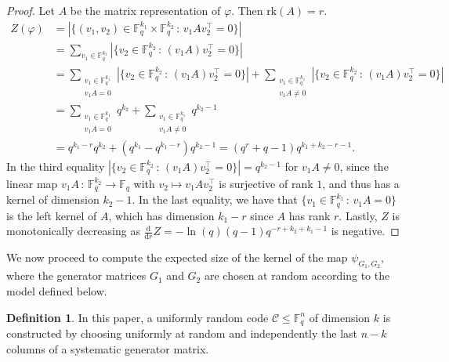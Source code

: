 \documentclass[a4paper,11pt,reqno]{article}
\newcommand{\F}{\mathbb{F}}
\newcommand{\rk}{\mathrm{rk}}
\newcommand{\C}{\mathcal{C}}
\theoremstyle{plain} \numberwithin{equation}{section}
\theoremstyle{definition}
\newtheorem{definition}[theorem]{Definition}
\begin{document}
\begin{proof}
Let $A$ be the matrix representation of $\varphi$. Then $\rk(A) = r$. 
    \begin{align*}
        Z(\varphi) &= |\{(v_1, v_2)\in \F_q^{k_1}\times \F_q^{k_2} \, \colon \, v_1Av_2^\top = 0\}|\\
                    &= \sum_{v_1 \in \F_q^{k_1}} |\{v_2 \in \F_q^{k_2} \, : \, (v_1A)v_2^\top = 0\}| \\
                    &= \sum_{\substack{v_1 \in \F_q^{k_1}\\ v_1A = 0}}|\{v_2 \in \F_q^{k_2} \, : \, (v_1A)v_2^\top  = 0\}| + \sum_{\substack{v_1 \in \F_q^{k_1}\\ v_1A \neq 0}}|\{v_2 \in \F_q^{k_2} \, : \, (v_1A)v_2^\top  = 0\}|\\
                    &= \sum_{\substack{v_1 \in \F_q^{k_1}\\ v_1A = 0}} q^{k_2} + \sum_{\substack{v_1 \in \F_q^{k_1}\\ v_1A \neq 0}} q^{k_2-1}\\
                    &= q^{k_1 -r}q^{k_2} + (q^{k_1} - q^{k_1 -r})q^{k_2-1} = (q^r+q-1)q^{k_1+k_2-r-1}.
    \end{align*}
In the third equality $|\{v_2 \in \F_q^{k_2} \, : \, (v_1A)v_2^\top = 0\}| = q^{k_2 -1}$ for $v_1A \neq 0$, since the linear map $v_1A \, : \, \F_q^{k_2} \rightarrow \F_q$ with $v_2 \mapsto v_1Av_2^\top$ is surjective of rank $1$, and thus has a kernel of dimension $k_2 -1$. 
In the last equality, we have that $\{v_1 \in \F_q^{k_1} \, : \, v_1A = 0\}$ is the left kernel of $A$, which has dimension $k_1 -r$ since $A$ has rank $r$. Lastly, $Z$ is monotonically decreasing as $\frac{\mathrm{d}}{\mathrm{d}r} Z = -\ln(q) (q-1)q^{-r+k_2+k_1-1}$ is negative.
\end{proof}


We now proceed to compute the expected size of the kernel of the map $\psi_{G_1,G_2}$, where the generator matrices $G_1$ and $G_2$ are chosen at random according to the model defined below.

\begin{definition}\label{def:setuprand}
In this paper, a uniformly random code $\C \leq \F_q^n$ of dimension $k$ is constructed by choosing uniformly at random and independently the last $n-k$ columns of a systematic generator matrix.
\end{definition}
\end{document}
